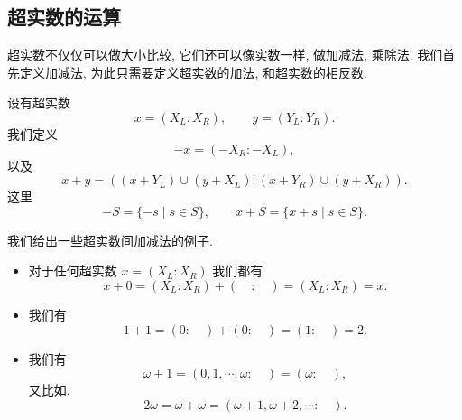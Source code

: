 





\subsection{超实数的运算}

超实数不仅仅可以做大小比较, 它们还可以像实数一样, 做加减法, 乘除法. 
我们首先定义加减法, 为此只需要定义超实数的加法, 和超实数的相反数.
\begin{definition}
设有超实数 \[x=(X_L:X_R),\hspace{2em} y=(Y_L:Y_R).\]
我们定义
\[-x=(-X_R:-X_L),\]
以及
\[x+y=((x+Y_L)\cup(y+X_L):(x+Y_R)\cup(y+X_R)).\] 
这里 
\[-S=\{-s\mid s\in S\},\hspace{2em} x+S=\{x+s\mid s\in S\}.\]
\end{definition}



\begin{example}
我们给出一些超实数间加减法的例子.
\begin{itemize}
    \item 对于任何超实数 $x=(X_L:X_R)$ 我们都有 
    \[x+0=(X_L:X_R)+(\quad:\quad)=(X_L:X_R)=x.\]
    \item 我们有 \[1+1=(0:\quad)+(0:\quad)=(1:\quad)=2.\]
    \item 
        我们有 \[\omega+1=(0,1,\cdots,\omega:\quad)=(\omega:\quad),\]
        又比如, \[2\omega=\omega+\omega=(\omega+1,\omega+2,\cdots:\quad).\]
\end{itemize}
\end{example}



